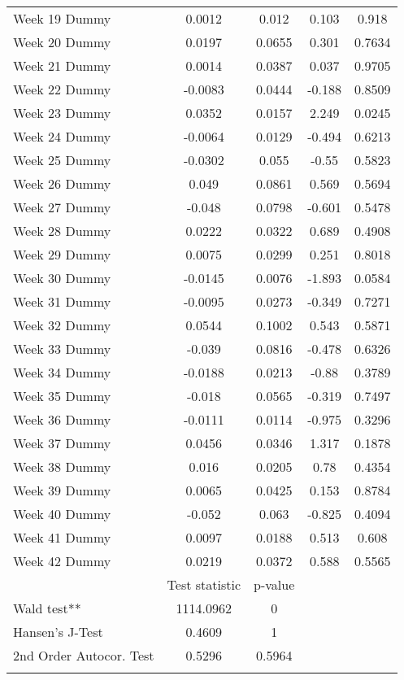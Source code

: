 \begin{longtable}{lcccc}
  Week 19 Dummy & 0.0012 & 0.012 & 0.103 & 0.918 \\ 
  Week 20 Dummy & 0.0197 & 0.0655 & 0.301 & 0.7634 \\ 
  Week 21 Dummy & 0.0014 & 0.0387 & 0.037 & 0.9705 \\ 
  Week 22 Dummy & -0.0083 & 0.0444 & -0.188 & 0.8509 \\ 
  Week 23 Dummy & 0.0352 & 0.0157 & 2.249 & 0.0245 \\ 
  Week 24 Dummy & -0.0064 & 0.0129 & -0.494 & 0.6213 \\ 
  Week 25 Dummy & -0.0302 & 0.055 & -0.55 & 0.5823 \\ 
  Week 26 Dummy & 0.049 & 0.0861 & 0.569 & 0.5694 \\ 
  Week 27 Dummy & -0.048 & 0.0798 & -0.601 & 0.5478 \\ 
  Week 28 Dummy & 0.0222 & 0.0322 & 0.689 & 0.4908 \\ 
  Week 29 Dummy & 0.0075 & 0.0299 & 0.251 & 0.8018 \\ 
  Week 30 Dummy & -0.0145 & 0.0076 & -1.893 & 0.0584 \\ 
  Week 31 Dummy & -0.0095 & 0.0273 & -0.349 & 0.7271 \\ 
  Week 32 Dummy & 0.0544 & 0.1002 & 0.543 & 0.5871 \\ 
  Week 33 Dummy & -0.039 & 0.0816 & -0.478 & 0.6326 \\ 
  Week 34 Dummy & -0.0188 & 0.0213 & -0.88 & 0.3789 \\ 
  Week 35 Dummy & -0.018 & 0.0565 & -0.319 & 0.7497 \\ 
  Week 36 Dummy & -0.0111 & 0.0114 & -0.975 & 0.3296 \\ 
  Week 37 Dummy & 0.0456 & 0.0346 & 1.317 & 0.1878 \\ 
  Week 38 Dummy & 0.016 & 0.0205 & 0.78 & 0.4354 \\ 
  Week 39 Dummy & 0.0065 & 0.0425 & 0.153 & 0.8784 \\ 
  Week 40 Dummy & -0.052 & 0.063 & -0.825 & 0.4094 \\ 
  Week 41 Dummy & 0.0097 & 0.0188 & 0.513 & 0.608 \\ 
  Week 42 Dummy & 0.0219 & 0.0372 & 0.588 & 0.5565 \\ 
   & Test statistic & p-value &  &  \\ 
  Wald test** & 1114.0962 & 0 &  &  \\ 
  Hansen's J-Test & 0.4609 & 1 &  &  \\ 
  2nd Order Autocor. Test & 0.5296 & 0.5964 &  &  \\ 
   \bottomrule
\caption{Results of two-step GMM estimation of policy, behavior and information on %
\label{tab_results:deaths_spec_6_full}
\end{longtable}
\endgroup
